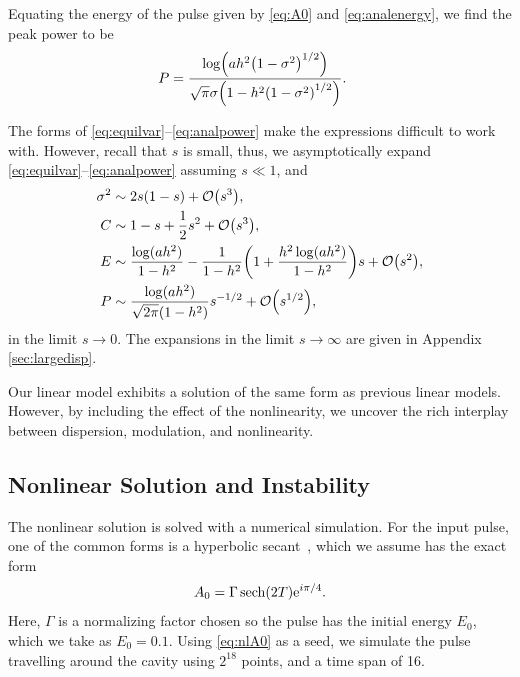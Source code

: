 \documentclass[9pt,twocolumn,twoside]{osajnl}
\let\originalleft\left
\let\originalright\right
\renewcommand{\left}{\mathopen{}\mathclose\bgroup\originalleft}
\renewcommand{\right}{\aftergroup\egroup\originalright}
\providecommand{\bigO}[1]{\ensuremath{\mathop{}\mathopen{}\mathcal{O}\mathopen{}\left(#1\right)}} %
\DeclareMathOperator{\sech}{sech}
\begin{document}
Equating the energy of the pulse given by \eqref{eq:A0} and \eqref{eq:analenergy}, we find the peak power to be
\begin{align}
	P &= \frac{\log \left( a h^2 \left( 1 - \sigma^2 \right)^{1/2} \right)}{\sqrt{\pi} \sigma \left( 1 - h^2 \left( 1 - \sigma^2 \right)^{1/2} \right)}.
	\label{eq:analpower}
\end{align}

The forms of \eqref{eq:equilvar}--\eqref{eq:analpower} make the expressions difficult to work with. However, recall that $s$ is small, thus, we asymptotically expand \eqref{eq:equilvar}--\eqref{eq:analpower} assuming $s \ll 1$, and
\begin{align}
	\sigma^2 &\sim 2s(1 - s) + \bigO{s^3}, \\
	C &\sim 1 - s + \frac{1}{2}s^2 + \bigO{s^3}, \\
	E &\sim \frac{\log (a h^2)}{1 - h^2} - \frac{1}{1 - h^2} \left( 1 + \frac{h^2 \log(a h^2)}{1 - h^2}  \right) s + \bigO{s^2}, \label{eq:maxenergy} \\
	P &\sim \frac{\log(ah^2)}{\sqrt{2 \pi}(1 - h^2)} s^{-1/2} + \bigO{s^{1/2}},
\end{align}
in the limit $s \rightarrow 0$. The expansions in the limit $s \rightarrow \infty$ are given in Appendix \ref{sec:largedisp}.

Our linear model exhibits a solution of the same form as previous linear models. However, by including the effect of the nonlinearity, we uncover the rich interplay between dispersion, modulation, and nonlinearity.

\subsection{Nonlinear Solution and Instability}
\label{sec:nlresults}
The nonlinear solution is solved with a numerical simulation. For the input pulse, one of the common forms is a hyperbolic secant~\cite{coen1997, finot2008, rothenberg1989b, tomlinson1984}, which we assume has the exact form
\begin{align}
	A_0 = \Gamma \sech \left( 2 T \right) \textrm{e}^{i \pi / 4}.
	\label{eq:nlA0}
\end{align}
Here, $\Gamma$ is a normalizing factor chosen so the pulse has the initial energy $E_0$, which we take as $E_0 = 0.1$. Using \eqref{eq:nlA0} as a seed, we simulate the pulse travelling around the cavity using $2^{18}$ points, and a time span of 16.
\end{document}
